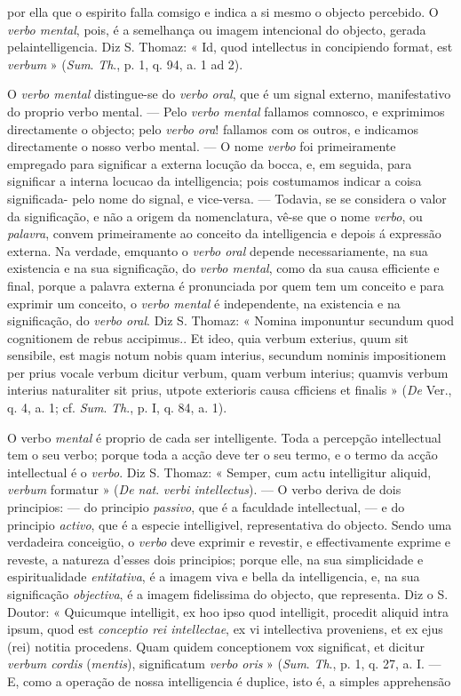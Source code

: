 por ella que o espirito falla comsigo e indica a si mesmo o objecto percebido. O \emph{verbo mental}, pois, é a semelhança ou imagem intencional do objecto, gerada pelaintelligencia. Diz S. Thomaz: « Id, quod intellectus in concipiendo format, est \emph{verbum} » (\emph{Sum}. \emph{Th}., p. 1, q. 94, a. 1 ad 2).\par O \emph{verbo mental} distingue-se do \emph{verbo oral}, que é um signal externo, manifestativo do proprio verbo mental. --- Pelo \emph{verbo mental} fallamos comnosco, e exprimimos directamente o objecto; pelo \emph{verbo ora}! fallamos com os outros, e indicamos directamente o nosso verbo mental. --- O nome \emph{verbo} foi primeiramente empregado para significar a externa locução da bocca, e, em seguida, para significar a interna locucao da intelligencia; pois costumamos indicar a coisa significada- pelo nome do signal, e vice-versa. --- Todavia, se se considera o valor da significação, e não a origem da nomenclatura, vê-se que o nome \emph{verbo}, ou \emph{palavra}, convem primeiramente ao conceito da intelligencia e depois á expressão externa. Na verdade, emquanto o \emph{verbo oral} depende necessariamente, na sua existencia e na sua significação, do \emph{verbo mental}, como da sua causa efficiente e final, porque a palavra externa é pronunciada por quem tem um conceito e para exprimir um conceito, o \emph{verbo mental} é independente, na existencia e na significação, do \emph{verbo oral}. Diz S. Thomaz: « Nomina imponuntur secundum quod cognitionem de rebus accipimus.. Et ideo, quia verbum exterius, quum sit sensibile, est magis notum nobis quam interius, secundum nominis impositionem per prius vocale verbum dicitur verbum, quam verbum interius; quamvis verbum interius naturaliter sit prius, utpote exterioris causa cfficiens et finalis » (\emph{De} Ver., q. 4, a. 1; cf. \emph{Sum}. \emph{Th}., p. I, q. 84, a. 1).\par O verbo \emph{mental} é proprio de cada ser intelligente. Toda a percepção intellectual tem o seu verbo; porque toda a acção deve ter o seu termo, e o termo da acção intellectual é o \emph{verbo}. Diz S. Thomaz: « Semper, cum actu intelligitur aliquid, \emph{verbum} formatur » (\emph{De nat}. \emph{verbi intellectus}). --- O verbo deriva de dois principios: --- do principio \emph{passivo}, que é a faculdade intellectual, --- e do principio \emph{activo}, que é a especie intelligivel, representativa do objecto. Sendo uma verdadeira conceigüo, o \emph{verbo} deve exprimir e revestir, e effectivamente exprime e reveste, a natureza d'esses dois principios; porque elle, na sua simplicidade e espiritualidade \emph{entitativa}, é a imagem viva e bella da intelligencia, e, na sua significação \emph{objectiva}, é a imagem fidelissima do objecto, que representa. Diz o S. Doutor: « Quicumque intelligit, ex hoo ipso quod intelligit, procedit aliquid intra ipsum, quod est \emph{conceptio rei intellectae}, ex vi intellectiva proveniens, et ex ejus (rei) notitia procedens. Quam quidem conceptionem vox significat, et dicitur \emph{verbum cordis} (\emph{mentis}), significatum \emph{verbo oris} » (\emph{Sum}. \emph{Th}., p. 1, q. 27, a. I. --- E, como a operação de nossa intelligencia é duplice, isto é, a simples apprehensão 